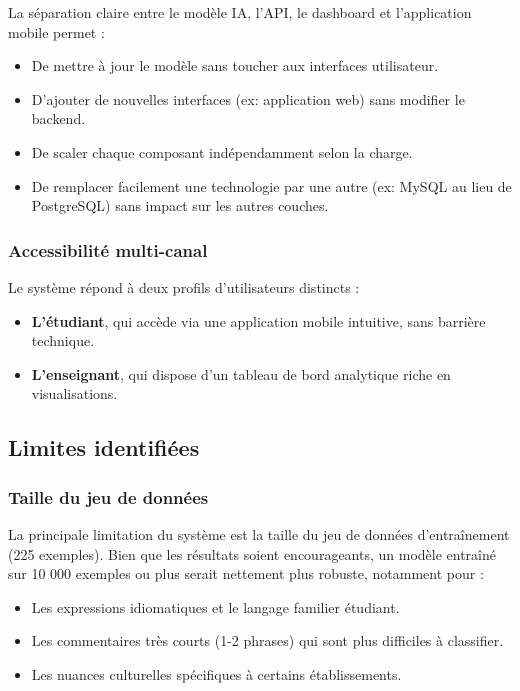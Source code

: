 La séparation claire entre le modèle IA, l'API, le dashboard et
l'application mobile permet :
\begin{itemize}
  \item De mettre à jour le modèle sans toucher aux interfaces utilisateur.
  \item D'ajouter de nouvelles interfaces (ex: application web) sans
        modifier le backend.
  \item De scaler chaque composant indépendamment selon la charge.
  \item De remplacer facilement une technologie par une autre (ex: MySQL
        au lieu de PostgreSQL) sans impact sur les autres couches.
\end{itemize}

\subsubsection{Accessibilité multi-canal}

Le système répond à deux profils d'utilisateurs distincts :
\begin{itemize}
  \item \textbf{L'étudiant}, qui accède via une application mobile intuitive,
        sans barrière technique.
  \item \textbf{L'enseignant}, qui dispose d'un tableau de bord analytique
        riche en visualisations.
\end{itemize}

\subsection{Limites identifiées}

\subsubsection{Taille du jeu de données}

La principale limitation du système est la taille du jeu de données
d'entraînement (225 exemples). Bien que les résultats soient encourageants,
un modèle entraîné sur 10 000 exemples ou plus serait nettement plus robuste,
notamment pour :
\begin{itemize}
  \item Les expressions idiomatiques et le langage familier étudiant.
  \item Les commentaires très courts (1-2 phrases) qui sont plus difficiles
        à classifier.
  \item Les nuances culturelles spécifiques à certains établissements.
\end{itemize}

